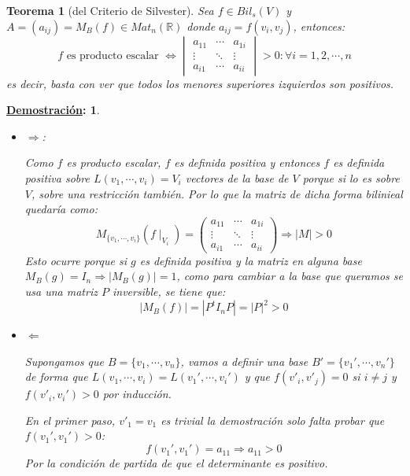 \documentclass[10pt,a4paper,openright]{book}
\theoremstyle{break}
\newtheorem*{theo}{Teorema}
\newtheorem*{demo}{\underline{Demostración}:}
\begin{document}
\begin{theo}[del Criterio de Silvester]
Sea $f\in Bil_s(V)$ y $A=(a_{ij})=M_B(f)\in Mat_n(\mathbb R)$ donde $a_{ij} = f(v_i,v_j)$, entonces:
$$f\mbox{ es producto escalar }\Leftrightarrow\begin{vmatrix} a_{11} & \cdots & a_{1i} \\ \vdots & \ddots & \vdots \\ a_{i1} & \cdots & a_{ii}\end{vmatrix} > 0 : \forall i =1, 2, \cdots , n$$
es decir, basta con ver que todos los menores superiores izquierdos son positivos.
\end{theo}
\begin{demo}
\begin{itemize}
\item $\Rightarrow $:

Como $f$ es producto escalar, $f$ es definida positiva y entonces $f$ es definida positiva sobre $L(v_1, \cdots, v_i) = V_i$ vectores de la base de $V$ porque si lo es sobre $V$, sobre una restricción también. Por lo que la matriz de dicha forma bilinieal quedaría como:
$$M_{\{v_1, \cdots, v_i\}}(f\mid_{V_i})=\begin{pmatrix} a_{11} & \cdots & a_{1i} \\ \vdots & \ddots & \vdots \\ a_{i1} & \cdots & a_{ii}\end{pmatrix} \Rightarrow |M| > 0$$
Esto ocurre porque si $g$ es definida positiva y la matriz en alguna base $M_B(g) = I_n\Rightarrow |M_B(g)|=1$, como para cambiar a la base que queramos se usa una matriz $P$ inversible, se tiene que:
$$|M_B(f)|=|P^tI_nP|=|P|^2 > 0$$

\item $\Leftarrow$

Supongamos que $B=\{v_1, \cdots, v_n\}$, vamos a definir una base $B'=\{v_1', \cdots, v_n'\}$ de forma que $L(v_1, \cdots, v_i) = L(v_1', \cdots, v_i')$ y que $f(v'_i, v'_j)=0$ si $i\neq j$ y $f(v'_i, v_i')>0$ por inducción.

En el primer paso, $v'_1=v_1$ es trivial la demostración solo falta probar que $f(v_1', v_1')>0$:
$$f(v_1', v_1') = a_{11}\Rightarrow a_{11}>0$$
Por la condición de partida de que el determinante es positivo.


\end{itemize}
\end{demo}
\end{document}
